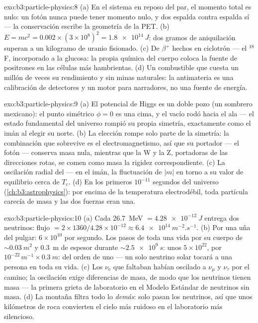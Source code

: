 \begin{solution}{exo:b3:particle-physics:8}
(a) En el sistema en reposo del par, el momento total es nulo: un
fotón nunca puede tener momento nulo, y dos espalda contra espalda sí ---
la conservación escribe la geometría de la PET. (b) $E = mc^2 =
0.002\times(3\times10^8)^2 = \qty{1.8e14}{J}$: dos gramos de
aniquilación superan a un kilogramo de uranio fisionado. (c) De
 $\beta^+$ hechos en ciclotrón --- el $^{18}$F, incorporado a la
glucosa: la propia química del cuerpo coloca la fuente de positrones en
las células más hambrientas. (d) Un combustible que cuesta un millón de veces su
rendimiento y sin minas naturales: la antimateria es una calibración de
detectores y un motor para narradores, no una fuente de energía.
\end{solution}

\begin{solution}{exo:b3:particle-physics:9}
(a) El potencial de Higgs es un doble pozo (un sombrero mexicano): el
punto simétrico $\phi = 0$ es una cima, y el vacío rodó
hacia el ala --- el estado fundamental del universo rompió su propia
simetría, exactamente como el imán al elegir su norte. (b) La elección
rompe solo parte de la simetría: la combinación que sobrevive
es el electromagnetismo, así que su portador --- el fotón --- conserva
masa nula, mientras que la W y la Z, portadoras de las direcciones rotas,
se comen como masa la rigidez correspondiente. (c) La oscilación
radial del  --- en el imán, la
fluctuación de $|m|$ en torno a su valor de equilibrio cerca de
$T_{\text{c}}$. (d) En los primeros $10^{-11}$ segundos del
universo (\cref{ch:b3:astrophysics}): por encima de la temperatura
electrodébil, toda partícula carecía de masa y las dos fuerzas eran
una.
\end{solution}

\begin{solution}{exo:b3:particle-physics:10}
(a) Cada \qty{26.7}{MeV} $= \qty{4.28e-12}{J}$ entrega dos
neutrinos: flujo $= 2\times1360/4.28\times10^{-12} \approx
\qty{6.4e14}{m^{-2}.s^{-1}}$. (b) Por una uña del pulgar:
$6\times10^{10}$ por segundo. Los pasos de toda una vida por su
cuerpo de ${\sim}\qty{0.03}{m^2}$ y \qty{0.3}{m} de espesor durante
${\sim}\qty{2.5e9}{s}$: unos $5\times10^{22}$, por
$10^{-22}\,\unit{m^{-1}}\times\qty{0.3}{m}$: del orden de uno ---
un solo neutrino solar tocará a una persona en toda su vida. (c)
Los $\nu_{\text{e}}$ que faltaban habían oscilado a $\nu_\mu$ y
$\nu_\tau$ por el camino; la oscilación exige diferencias de masa, de modo que
los neutrinos tienen masa --- la primera grieta de laboratorio en el
Modelo Estándar de neutrinos sin masa. (d) La montaña filtra
todo lo \emph{demás}: solo pasan los neutrinos, así que unos kilómetros de
roca convierten el cielo más ruidoso en el laboratorio más silencioso.
\end{solution}

